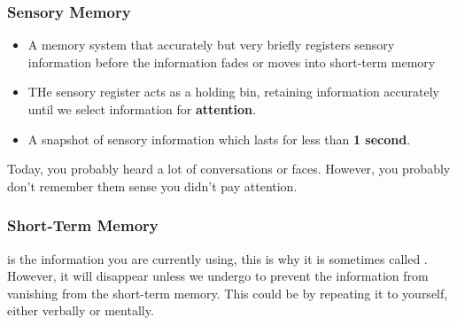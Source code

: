 \documentclass[../main/main.tex]{subfiles}
\begin{document}
\subsubsection{Sensory Memory}
\begin{itemize}
\item A memory system that accurately but very briefly registers sensory information before the information
    fades or moves into short-term memory
    \item THe sensory register acts as a holding bin, retaining information accurately until we select information for \textbf{attention}.
    \item A snapshot of sensory information which lasts for less than \textbf{1 second}.
    \end{itemize}
    \begin{example}
Today, you probably heard a lot of conversations or faces. However, you probably don't remember them sense you didn't pay attention.
                                    \end{example}
\subsubsection{Short-Term Memory}
     is the information you are currently using, this is why it is sometimes called .\\

    However, it will disappear unless we undergo  to prevent the information from vanishing from the short-term memory.
    This could be by repeating it to yourself, either verbally or mentally.\\
\end{document}
